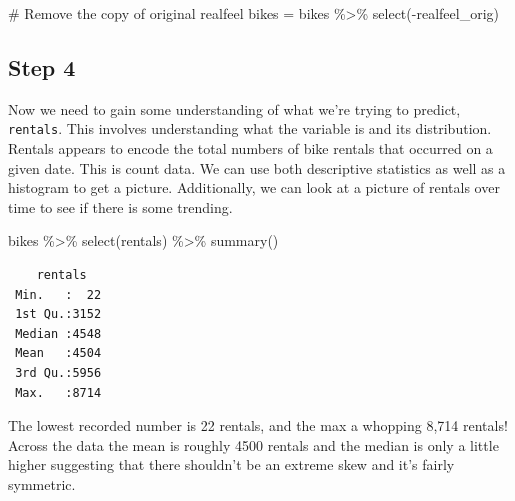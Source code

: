 \documentclass[
  letterpaper,
  DIV=11,
  numbers=noendperiod]{scrartcl}
\newenvironment{Shaded}{\begin{snugshade}}{\end{snugshade}}
\newcommand{\CommentTok}[1]{\textcolor[rgb]{0.37,0.37,0.37}{#1}}
\newcommand{\FunctionTok}[1]{\textcolor[rgb]{0.28,0.35,0.67}{#1}}
\newcommand{\NormalTok}[1]{\textcolor[rgb]{0.00,0.23,0.31}{#1}}
\newcommand{\OtherTok}[1]{\textcolor[rgb]{0.00,0.23,0.31}{#1}}
\newcommand{\SpecialCharTok}[1]{\textcolor[rgb]{0.37,0.37,0.37}{#1}}
\begin{document}
\begin{Shaded}
\begin{Highlighting}[]
\CommentTok{\# Remove the copy of original realfeel}
\NormalTok{bikes }\OtherTok{=}\NormalTok{ bikes }\SpecialCharTok{\%\textgreater{}\%} \FunctionTok{select}\NormalTok{(}\SpecialCharTok{{-}}\NormalTok{realfeel\_orig)}
\end{Highlighting}
\end{Shaded}

\hypertarget{step-4}{%
\subsection{Step 4}\label{step-4}}

Now we need to gain some understanding of what we're trying to predict,
\texttt{rentals}. This involves understanding what the variable is and
its distribution. Rentals appears to encode the total numbers of bike
rentals that occurred on a given date. This is count data. We can use
both descriptive statistics as well as a histogram to get a picture.
Additionally, we can look at a picture of rentals over time to see if
there is some trending.

\begin{Shaded}
\begin{Highlighting}[]
\NormalTok{bikes }\SpecialCharTok{\%\textgreater{}\%} \FunctionTok{select}\NormalTok{(rentals) }\SpecialCharTok{\%\textgreater{}\%} \FunctionTok{summary}\NormalTok{()}
\end{Highlighting}
\end{Shaded}

\begin{verbatim}
    rentals    
 Min.   :  22  
 1st Qu.:3152  
 Median :4548  
 Mean   :4504  
 3rd Qu.:5956  
 Max.   :8714  
\end{verbatim}

The lowest recorded number is 22 rentals, and the max a whopping 8,714
rentals! Across the data the mean is roughly 4500 rentals and the median
is only a little higher suggesting that there shouldn't be an extreme
skew and it's fairly symmetric.
\end{document}
